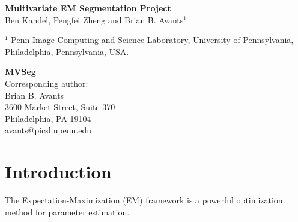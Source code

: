 \documentclass[11pt,english]{article}
\begin{document}
\normalem

\vspace*{5cm}

\begin{center}
{\Large \bf Multivariate EM Segmentation Project} \\
\vspace*{0.5cm}
{\normalsize Ben Kandel, Pengfei Zheng and Brian B. Avants$^1$} \\
\begin{singlespace} 
{\scriptsize  $^1$ Penn Image Computing and Science Laboratory, University of Pennsylvania, Philadelphia, Pennsylvania,  USA.}
\end{singlespace}
\end{center}

\vfill

\begin{singlespace} 
\scriptsize
\flushleft
{\bf MVSeg}\\
Corresponding author: \\
Brian B. Avants\\
3600 Market Street, Suite 370\\
Philadelphia, PA  19104\\
avants@picsl.upenn.edu\\
\end{singlespace} 
\clearpage
\begin{abstract} 
Neuroanatomical coordinate systems are essential for the
interpretation of structural and functional imaging studies.
However, manual delineation of the neuroanatomical complex is time
consuming and prone to random performance variability.  This
work describes an open source, image-based approach to white matter parcellation which uses training data to propagate
structural labelings to individual images.  The Bayesian formulation of the segmentation problem is 
solved using the Expectation Maximization (EM) algorithm with a
variety of different multivariate distance metrics.  We evaluate our
ability to segment DTI data based on comparison with
registration-based approaches and biological validity of results. 
\end{abstract}

\section{Introduction}
The Expectation-Maximization (EM) framework \citep{Dempster1977} is a
powerful optimization method for parameter estimation.
\end{document}
